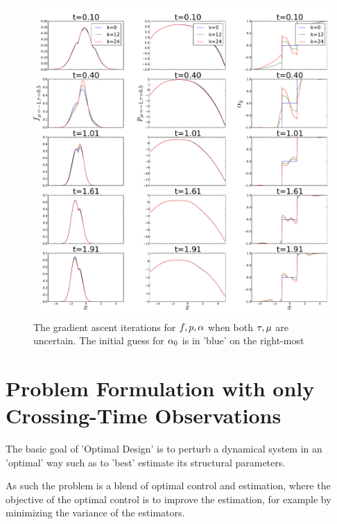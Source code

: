 \begin{figure}[htp]
\begin{center}
  \includegraphics[width=1\textwidth]{Figs/OUFBSolver_BetaMu/FB_alpha_iterates_uICs_5_Tf=2.pdf}
  \caption[tableofCs]{The gradient ascent iterations for $f,p,\alpha$ when both
  ${ \tau }, {\mu }$ are uncertain. The initial guess for $\alpha_0$ is in 'blue' on the
  right-most}
  \label{fig:fpalpha_iterates_mubeta}
\end{center}
\end{figure}



\clearpage


\section{Problem Formulation with only Crossing-Time Observations}
 
The basic goal of 'Optimal Design' is to perturb a dynamical system in an
'optimal' way such as to 'best' estimate its structural parameters. 

As such the problem is a blend of optimal control and estimation, where the
objective of the optimal control is to improve the estimation, for example by
minimizing the variance of the estimators. 

